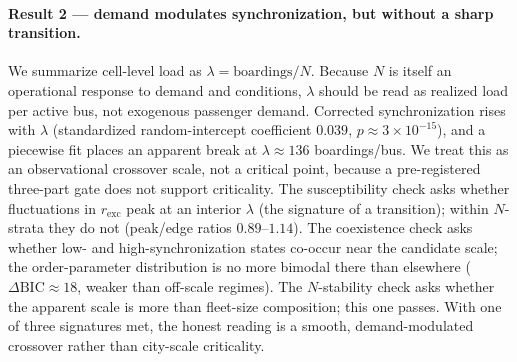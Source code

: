 \documentclass[9pt,twocolumn,twoside]{opticajnl}
\begin{document}
\paragraph{Result 2 --- demand modulates synchronization, but without a sharp transition.}
We summarize cell-level load as $\lambda = \text{boardings}/N$. Because $N$ is itself an
operational response to demand and conditions, $\lambda$ should be read as realized load per
active bus, not exogenous passenger demand. Corrected synchronization rises with $\lambda$
(standardized random-intercept coefficient $0.039$, $p\approx 3\times10^{-15}$), and a
piecewise fit places an apparent break at $\lambda \approx 136$ boardings/bus. We treat this
as an observational crossover scale, not a critical point, because a pre-registered three-part
gate does not support criticality. The susceptibility check asks whether fluctuations in
$r_{\mathrm{exc}}$ peak at an interior $\lambda$ (the signature of a transition); within
$N$-strata they do not (peak/edge ratios $0.89$--$1.14$). The coexistence check asks whether
low- and high-synchronization states co-occur near the candidate scale; the order-parameter
distribution is no more bimodal there than elsewhere ($\Delta\mathrm{BIC}\approx 18$, weaker
than off-scale regimes). The $N$-stability check asks whether the apparent scale is more than
fleet-size composition; this one passes. With one of three signatures met, the honest reading
is a smooth, demand-modulated crossover rather than city-scale criticality.
\end{document}
